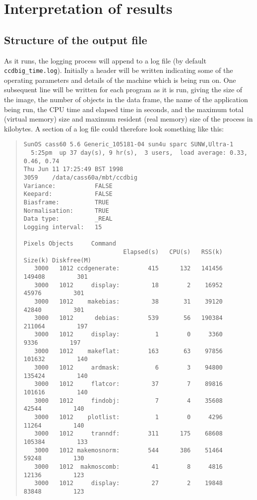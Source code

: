 \section{Interpretation of results}

\subsection{Structure of the output file}

As it runs, the logging process will append to a log file 
(by default {\tt ccdbig\_time.log}).
Initially a header will be written indicating some of the
operating parameters and details of the machine which is
being run on.
One subsequent line will be written for each program as it is run,
giving
the size of the image, 
the number of objects in the data frame,
the name of the application being run,
the CPU time and
elapsed time in seconds,
and
the maximum total (virtual memory) size and
maximum resident (real memory) size of the process in kilobytes.
A section of a log file could therefore look something like this:
\begin{quote}
\begin{verbatim}
SunOS cass60 5.6 Generic_105181-04 sun4u sparc SUNW,Ultra-1
  5:25pm  up 37 day(s), 9 hr(s),  3 users,  load average: 0.33, 0.46, 0.74
Thu Jun 11 17:25:49 BST 1998
3059    /data/cass60a/mbt/ccdbig
Variance:           FALSE
Keepard:            FALSE 
Biasframe:          TRUE
Normalisation:      TRUE
Data type:          _REAL
Logging interval:   15

Pixels Objects     Command
                            Elapsed(s)   CPU(s)   RSS(k)  Size(k) Diskfree(M)
   3000   1012 ccdgenerate:        415      132   141456   149408         301
   3000   1012     display:         18        2    16952    45976         301
   3000   1012    makebias:         38       31    39120    42840         301
   3000   1012      debias:        539       56   190384   211064         197
   3000   1012     display:          1        0     3360     9336         197
   3000   1012    makeflat:        163       63    97856   101632         140
   3000   1012     ardmask:          6        3    94800   135424         140
   3000   1012     flatcor:         37        7    89816   101616         140
   3000   1012     findobj:          7        4    35608    42544         140
   3000   1012    plotlist:          1        0     4296    11264         140
   3000   1012     tranndf:        311      175    68608   105384         133
   3000   1012 makemosnorm:        544      386    51464    59248         130
   3000   1012  makmoscomb:         41        8     4816    12136         123
   3000   1012     display:         27        2    19848    83848         123
\end{verbatim}
\end{quote}

